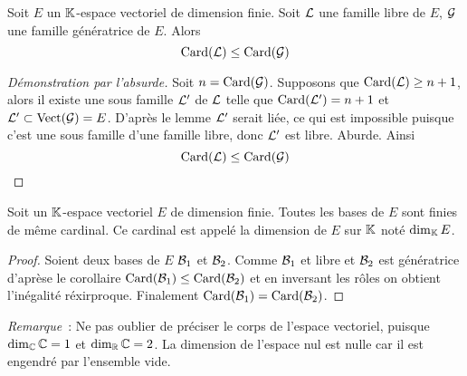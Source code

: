 \begin{cor}
  Soit $E$ un $\mathbb{K}$-espace vectoriel de dimension finie. Soit $\mathcal{L}$ une famille libre de $E$, $\mathcal{G}$ une famille génératrice de $E$. Alors
  \begin{equation}
    \operatorname{Card}(\mathcal{L}) \leq \operatorname{Card}(\mathcal{G})
  \end{equation}
\end{cor}
\begin{proof}[Démonstration par l'absurde]
  Soit $n = \operatorname{Card}(\mathcal{G})$. Supposons que $\operatorname{Card}(\mathcal{L}) \geq n+1$, alors il existe une sous famille $\mathcal{L}'$ de $\mathcal{L}$ telle que $\operatorname{Card}(\mathcal{L}')=n+1$ et $\mathcal{L}' \subset \operatorname{Vect}(\mathcal{G})=E$. D'après le lemme $\mathcal{L}'$ serait liée, ce qui est impossible puisque c'est une sous famille d'une famille libre, donc $\mathcal{L}'$ est libre. Aburde.  Ainsi 
  \begin{equation}
    \operatorname{Card}(\mathcal{L}) \leq \operatorname{Card}(\mathcal{G})
  \end{equation}
\end{proof}

\begin{theo}
  Soit un $\mathbb{K}$-espace vectoriel $E$ de dimension finie. Toutes les bases de $E$ sont finies de même cardinal. Ce cardinal est appelé la dimension de $E$ sur $\mathbb{K}$ noté $\operatorname{dim}_{\mathbb{K}} E$.
\end{theo}
\begin{proof}
  Soient deux bases de $E$ $\mathcal{B}_1$ et $\mathcal{B}_2$. Comme $\mathcal{B}_1$ et libre et $\mathcal{B}_2$ est génératrice d'aprèse le corollaire $\operatorname{Card}(\mathcal{B}_1) \leq \operatorname{Card}(\mathcal{B}_2)$ et en inversant les rôles on obtient l'inégalité réxirproque. Finalement $\operatorname{Card}(\mathcal{B}_1)=\operatorname{Card}(\mathcal{B}_2)$.
\end{proof}

\emph{Remarque}~: Ne pas oublier de préciser le corps de l'espace vectoriel, puisque $\operatorname{dim}_{\mathbb{C}} \mathbb{C}=1$ et $\operatorname{dim}_{\mathbb{R}} \mathbb{C}=2$. La dimension de l'espace nul est nulle car il est engendré par l'ensemble vide.

